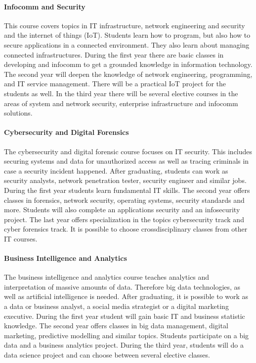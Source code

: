 \paragraph{Infocomm and Security}
This course covers topics in IT infrastructure, network engineering and security and the internet of things (IoT). Students learn how to program, but also how to secure applications in a connected environment. They also learn about managing connected infrastructures. During the first year there are basic classes in developing and infocomm to get a grounded knowledge in information technology. The second year will deepen the knowledge of network engineering, programming, and IT service management. There will be a practical IoT project for the students as well.
In the third year there will be several elective courses in the areas of system and network security, enterprise infrastructure and infocomm solutions.

\paragraph{Cybersecurity and Digital Forensics}
The cybersecurity and digital forensic course focuses on IT security. This includes securing systems and data for unauthorized access as well as tracing criminals in case a security incident happened. After graduating, students can work as security analysts, network penetration tester, security engineer and similar jobs. During the first year students learn fundamental IT skills. The second year offers classes in forensics, network security, operating systems, security standards and more. Students will also complete an applications security and an infosecurity project.
The last year offers specialization in the topics cybersecurity track and cyber forensics track. It is possible to choose crossdisciplinary classes from other IT courses.

\paragraph{Business Intelligence and Analytics}
The business intelligence and analytics course teaches analytics and interpretation of massive amounts of data. Therefore big data technologies, as well as artificial intelligence is needed. After graduating, it is possible to work as a data or business analyst, a social media strategist or a digital marketing executive. During the first year student will gain basic IT and business statistic knowledge. The second year offers classes in big data management, digital marketing, predictive modelling and similar topics. Students participate on a big data and a business analytics project.
During the third year, students will do a data science project and can choose between several elective classes.

